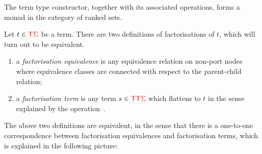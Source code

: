     The term type constructor, together with its associated operations, forms a monad in the category of ranked sets. 

    Let $t \in {\color{red}{\mathsf T}} {\color{red}{\Sigma}}$ be a term. 
    There are two definitions of factorisations of $t$, which will turn out to be equivalent. 
    \begin{enumerate}
        \item a \emph{factorisation equivalence} is any equivalence relation on non-port nodes where equivalence classes are connected with respect to the parent-child relation;
        \item a \emph{factorisation term} is any term $s  \in {\color{red}{\mathsf T}} {\color{red}{\mathsf T}} {\color{red}{\Sigma}}$ which flattens to $t$ in the sense explained by the operation~.
    \end{enumerate}
    The above two definitions are equivalent, in the sense that there is a one-to-one correspondence between factorisation equivalences and factorisation terms, which is explained in the following picture:

